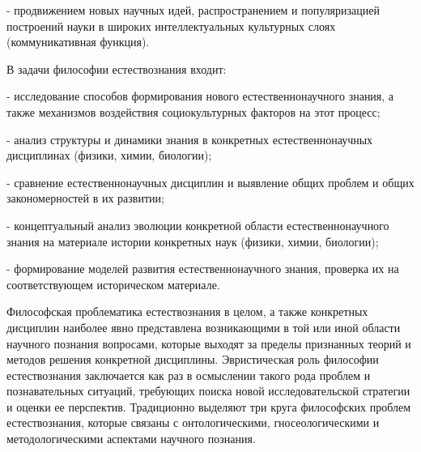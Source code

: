 \documentclass[exam_answers.tex]{subfiles}
\begin{document}
- продвижением новых научных идей, распространением и
популяризацией построений науки в широких интеллектуальных культурных
слоях (коммуникативная функция).

В задачи философии естествознания входит:

- исследование способов формирования нового естественнонаучного
знания, а также механизмов воздействия социокультурных факторов на этот
процесс;

- анализ структуры и динамики знания в конкретных естественнонаучных
дисциплинах (физики, химии, биологии); 

- сравнение естественнонаучных дисциплин и выявление общих проблем и
общих закономерностей в их развитии;

- концептуальный анализ эволюции конкретной области
естественнонаучного знания на материале истории конкретных наук (физики,
химии, биологии);

- формирование моделей развития естественнонаучного знания, проверка
их на соответствующем историческом материале.

Философская проблематика естествознания в целом, а также конкретных
дисциплин наиболее явно представлена возникающими в той или иной области
научного познания вопросами, которые выходят за пределы признанных теорий
и методов решения конкретной дисциплины. Эвристическая роль философии
естествознания заключается как раз в осмыслении такого рода проблем и
познавательных ситуаций, требующих поиска новой исследовательской
стратегии и оценки ее перспектив. Традиционно выделяют три круга
философских проблем естествознания, которые связаны с онтологическими,
гносеологическими и методологическими аспектами научного познания.
\end{document}
